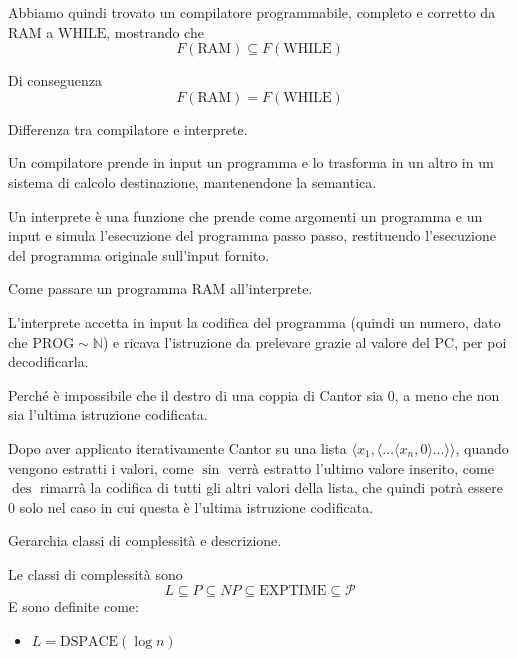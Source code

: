 \documentclass[12pt, answers]{exam}
\theoremstyle{plain}
\DeclareMathOperator{\des}{des}
\newcommand{\prog}{\text{PROG}}
\newcommand{\dspace}{\text{DSPACE}}
\newcommand{\exptime}{\text{EXPTIME}}
\newcommand{\ram}{\text{RAM}}
\newcommand{\while}{\text{WHILE}}
\newcommand{\cp}{\mathcal{P}}
\newcommand{\N}{\mathbb{N}}
\begin{document}
\begin{questions}
\begin{solution}
            Abbiamo quindi trovato un compilatore programmabile, completo e corretto da $\ram$ a $\while$, mostrando che
            $$ F(\ram) \subseteq F(\while) $$
            
            Di conseguenza
            $$ F(\ram) = F(\while) $$
        \end{solution}
        
        \question Differenza tra compilatore e interprete.
        
        \begin{solution}
            Un compilatore prende in input un programma e lo trasforma in un altro in un sistema di calcolo destinazione, mantenendone la semantica. 
            
            Un interprete è una funzione che prende come argomenti un programma e un input e simula l'esecuzione del programma passo passo, restituendo l'esecuzione del programma originale sull'input fornito.
        \end{solution}
        
        \question Come passare un programma $\ram$ all'interprete.
        
        \begin{solution}
            L'interprete accetta in input la codifica del programma (quindi un numero, dato che $\prog \sim \N$) e ricava l'istruzione da prelevare grazie al valore del PC, per poi decodificarla.
        \end{solution}
        
        \question Perché è impossibile che il destro di una coppia di Cantor sia 0, a meno che non sia l'ultima istruzione codificata.
        
        \begin{solution}
            Dopo aver applicato iterativamente Cantor su una lista $\langle x_1, \langle \dots \langle x_n, 0 \rangle \dots \rangle \rangle$, quando vengono estratti i valori, come $\sin$ verrà estratto l'ultimo valore inserito, come $\des$ rimarrà la codifica di tutti gli altri valori della lista, che quindi potrà essere 0 solo nel caso in cui questa è l'ultima istruzione codificata.
        \end{solution}
        
        \question Gerarchia classi di complessità e descrizione.
        
        \begin{solution}
            Le classi di complessità sono
            $$ L \subseteq P \subseteq NP \subseteq \exptime \subseteq \cp $$
            E sono definite come:
            \begin{itemize}
                \item $L = \dspace \left(\log n\right)$
                

\end{itemize}
\end{solution}
\end{questions}
\end{document}
